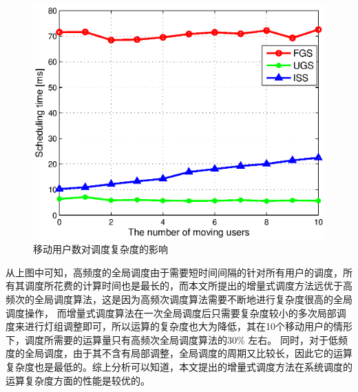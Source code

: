 \begin{figure}[htbp]
    \centering
	\includegraphics[width=\textwidth]{figures/chapter-5/MovingUserNum2Complexity.eps}
	\caption{移动用户数对调度复杂度的影响}
	\label{fig:moving-user-num-2-complexity}
\end{figure}

从上图中可知，高频度的全局调度由于需要短时间间隔的针对所有用户的调度，所有其调度所花费的计算时间也是最长的，而本文所提出的增量式调度方法远优于高频次的全局调度算法，这是因为高频次调度算法需要不断地进行复杂度很高的全局调度操作，
而增量式调度算法在一次全局调度后只需要复杂度较小的多次局部调度来进行灯组调整即可，所以运算的复杂度也大为降低，其在10个移动用户的情形下，调度所需要的运算量只有高频次全局调度算法的30\% 左右。
同时，对于低频度的全局调度，由于其不含有局部调整，全局调度的周期又比较长，因此它的运算复杂度也是最低的。综上分析可以知道，本文提出的增量式调度方法在系统调度的运算复杂度方面的性能是较优的。


